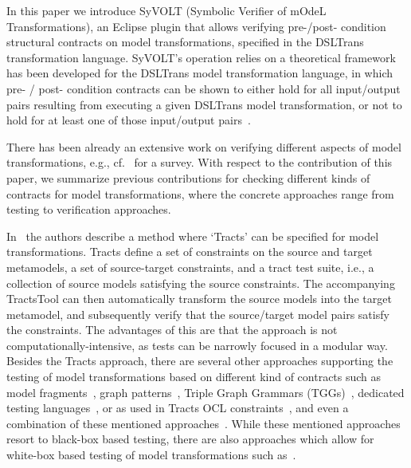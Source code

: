 In this paper we introduce SyVOLT (Symbolic Verifier of mOdeL Transformations),
an Eclipse plugin that allows verifying pre-/post- condition structural
contracts on model transformations, specified in the DSLTrans transformation
language. SyVOLT's operation relies on a theoretical framework has been
developed for the DSLTrans model transformation language, in which pre- / post- condition
contracts can be shown to either hold for all input/output pairs resulting from
executing a given DSLTrans model transformation, or not to hold for at least
one of those input/output pairs~\cite{Lucio2014}.


There has been already an extensive work on verifying different aspects of model
transformations, e.g., cf.~\cite{AmraniLSCDVTC12} for a survey.
With respect to the contribution of this paper, we summarize previous
contributions for checking different kinds of contracts for model
transformations, where the concrete approaches range from testing to
verification approaches.

In~\cite{Gogolla2011,Vallecillo2012} the authors describe a method where
`Tracts' can be specified for model transformations. Tracts define a set of
constraints on the source and target metamodels, a set of source-target
constraints, and a tract test suite, i.e., a collection of source models
satisfying the source constraints. The accompanying TractsTool can then
automatically transform the source models into the target metamodel, and
subsequently verify that the source/target model pairs satisfy the constraints.
The advantages of this are that the approach is not computationally-intensive,
as tests can be narrowly focused in a modular way. Besides the Tracts approach,
there are several other approaches supporting the testing of model
transformations based on different kind of contracts such as model
fragments~\cite{Mottu2008}, graph patterns~\cite{Guerra12,BaloghBCGHMPPRVa10},
Triple Graph Grammars (TGGs)~\cite{WieberAS14}, dedicated testing
languages~\cite{Kolovos06,Garcia-Dominguez11}, or as used in Tracts OCL
constraints~\cite{Cariou09}, and even a combination of these mentioned
approaches~\cite{Pele}. While these mentioned approaches resort to black-box
based testing, there are also approaches which allow for white-box based testing
of model transformations such as~\cite{GonzalezC12}.

